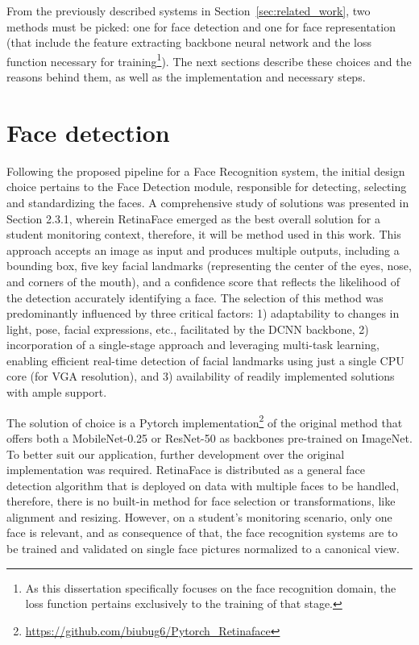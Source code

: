 \documentclass[class=report, crop=false, a4paper, 12pt]{standalone}
\begin{document}
\par From the previously described systems in Section~\ref{sec:related_work}, two methods must be picked: one for face detection and one for face representation (that include the feature extracting backbone neural network and the loss function necessary for training\footnote{As this dissertation specifically focuses on the face recognition domain, the loss function pertains exclusively to the training of that stage.}). The next sections describe these choices and the reasons behind them, as well as the implementation and necessary steps.

\section{Face detection}
\par Following the proposed pipeline for a Face Recognition system, the initial design choice pertains to the Face Detection module, responsible for detecting, selecting and standardizing the faces. A comprehensive study of solutions was presented in Section 2.3.1, wherein RetinaFace emerged as the best overall solution for a student monitoring context, therefore, it will be method used in this work. This approach accepts an image as input and produces multiple outputs, including a bounding box, five key facial landmarks (representing the center of the eyes, nose, and corners of the mouth), and a confidence score that reflects the likelihood of the detection accurately identifying a face. The selection of this method was predominantly influenced by three critical factors: 1) adaptability to changes in light, pose, facial expressions, etc., facilitated by the DCNN backbone, 2) incorporation of a single-stage approach and leveraging multi-task learning, enabling efficient real-time detection of facial landmarks using just a single CPU core (for VGA resolution), and 3) availability of readily implemented solutions with ample support.

\par The solution of choice is a Pytorch implementation\footnote{\url{https://github.com/biubug6/Pytorch_Retinaface}} of the original method that offers both a MobileNet-0.25 or ResNet-50 as backbones pre-trained on ImageNet. To better suit our application, further development over the original implementation was required. RetinaFace is distributed as a general face detection algorithm that is deployed on data with multiple faces to be handled, therefore, there is no built-in method for face selection or transformations, like alignment and resizing. However, on a student's monitoring scenario, only one face is relevant, and as consequence of that, the face recognition systems are to be trained and validated on single face pictures normalized to a canonical view.
\end{document}
